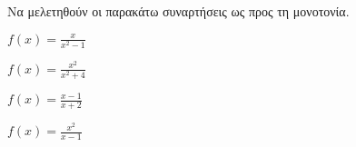 Να μελετηθούν οι παρακάτω συναρτήσεις ως προς τη μονοτονία.
\begin{alist}
\item $ f(x)=\frac{x}{x^2-1} $
\item $ f(x)=\frac{x^2}{x^2+4} $
\item $ f(x)=\frac{x-1}{x+2} $
\item $ f(x)=\frac{x^2}{x-1} $
\end{alist}
